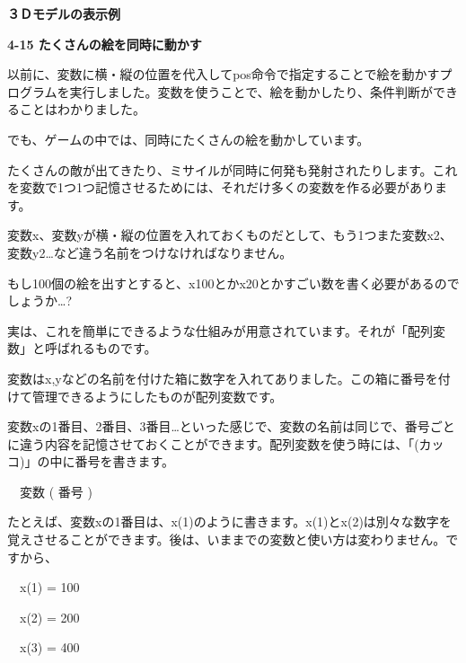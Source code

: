 \documentclass[a4paper,dvipdfmx]{jarticle}
\newcommand\textstyleqwerty[1]{#1}
\begin{document}
\bigskip


\bigskip


\bigskip


\bigskip


\bigskip


\bigskip

\textstyleqwerty{\textbf{３Ｄモデルの表示例}}


\bigskip


\bigskip


\bigskip


\bigskip

{\bfseries
4-15 たくさんの絵を同時に動かす}


\bigskip

以前に、変数に横・縦の位置を代入してpos命令で指定することで絵を動かすプログラムを実行しました。変数を使うことで、絵を動かしたり、条件判断ができることはわかりました。

でも、ゲームの中では、同時にたくさんの絵を動かしています。

たくさんの敵が出てきたり、ミサイルが同時に何発も発射されたりします。これを変数で1つ1つ記憶させるためには、それだけ多くの変数を作る必要があります。

変数x、変数yが横・縦の位置を入れておくものだとして、もう1つまた変数x2、変数y2…など違う名前をつけなければなりません。

もし100個の絵を出すとすると、x100とかx20とかすごい数を書く必要があるのでしょうか…?


\bigskip

実は、これを簡単にできるような仕組みが用意されています。それが「配列変数」と呼ばれるものです。

変数はx,yなどの名前を付けた箱に数字を入れてありました。この箱に番号を付けて管理できるようにしたものが配列変数です。

変数xの1番目、2番目、3番目…といった感じで、変数の名前は同じで、番号ごとに違う内容を記憶させておくことができます。配列変数を使う時には、「(カッコ)」の中に番号を書きます。


\bigskip

\ \ 変数 ( 番号 )


\bigskip

たとえば、変数xの1番目は、x(1)のように書きます。x(1)とx(2)は別々な数字を覚えさせることができます。後は、いままでの変数と使い方は変わりません。ですから、


\bigskip

\ \ x(1) = 100

\ \ x(2) = 200

\ \ x(3) = 400
\end{document}
